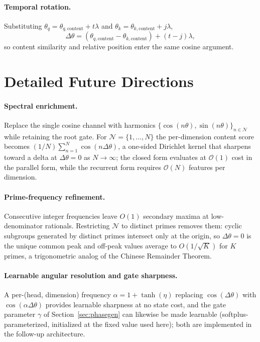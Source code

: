 \documentclass{article}
\newcommand{\cO}{\mathcal{O}}
\begin{document}
\paragraph{Temporal rotation.} Substituting $\theta_q = \theta_{q,\text{content}} + t\lambda$ and $\theta_k = \theta_{k,\text{content}} + j\lambda$,
\begin{equation}
\Delta\theta = (\theta_{q,\text{content}} - \theta_{k,\text{content}}) + (t - j)\lambda,
\end{equation}
so content similarity and relative position enter the same cosine argument.

\section{Detailed Future Directions}
\label{app:future}

\paragraph{Spectral enrichment.} Replace the single cosine channel with harmonics $\{\cos(n\theta), \sin(n\theta)\}_{n \in \mathcal{N}}$ while retaining the root gate. For $\mathcal{N} = \{1, \ldots, N\}$ the per-dimension content score becomes $(1/N)\sum_{n=1}^{N}\cos(n\Delta\theta)$, a one-sided Dirichlet kernel that sharpens toward a delta at $\Delta\theta = 0$ as $N \to \infty$; the closed form evaluates at $\cO(1)$ cost in the parallel form, while the recurrent form requires $\cO(N)$ features per dimension.

\paragraph{Prime-frequency refinement.} Consecutive integer frequencies leave $O(1)$ secondary maxima at low-denominator rationals. Restricting $\mathcal{N}$ to distinct primes removes them: cyclic subgroups generated by distinct primes intersect only at the origin, so $\Delta\theta = 0$ is the unique common peak and off-peak values average to $O(1/\sqrt{K})$ for $K$ primes, a trigonometric analog of the Chinese Remainder Theorem.

\paragraph{Learnable angular resolution and gate sharpness.} A per-(head, dimension) frequency $\alpha = 1 + \tanh(\eta)$ replacing $\cos(\Delta\theta)$ with $\cos(\alpha\Delta\theta)$ provides learnable sharpness at no state cost, and the gate parameter $\gamma$ of Section~\ref{sec:phasegen} can likewise be made learnable (softplus-parameterized, initialized at the fixed value used here); both are implemented in the follow-up architecture.
\end{document}
